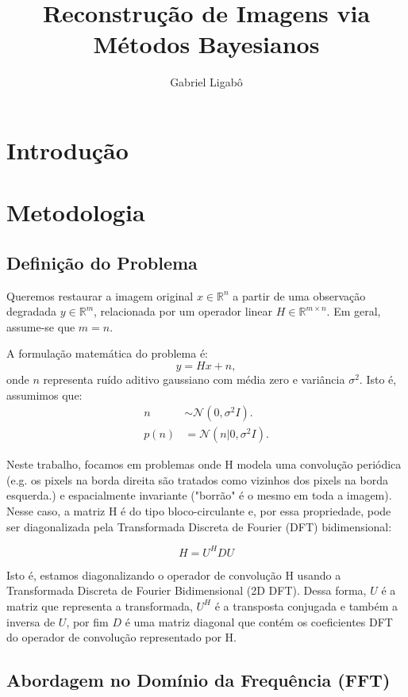 \documentclass[12pt]{article}
\title{Reconstrução de Imagens via Métodos Bayesianos}
\author{Gabriel Ligabô}
\begin{document}
\maketitle

\section{Introdução}

\section{Metodologia}

\subsection{Definição do Problema}

Queremos restaurar a imagem original $x \in \mathbb{R}^n$ a partir de uma observação degradada $y \in \mathbb{R}^m$, relacionada por um operador linear $H \in \mathbb{R}^{m \times n}$. Em geral, assume-se que $m = n$.

A formulação matemática do problema é:
\[
y = Hx + n,
\]
onde $n$ representa ruído aditivo gaussiano com média zero e variância $\sigma^2$. Isto é, assumimos que:
\begin{align*}
n &\sim \mathcal{N}(0, \sigma^2 I). \\
p(n) &= \mathcal{N}(n|0, \sigma^2 I).
\end{align*}

Neste trabalho, focamos em problemas onde H modela uma convolução periódica (e.g. os pixels na borda direita são tratados como vizinhos dos pixels na borda esquerda.) e espacialmente invariante ("borrão" é o mesmo em toda a imagem). Nesse caso, a matriz H é do tipo bloco-circulante e, por essa propriedade, pode ser diagonalizada pela Transformada Discreta de Fourier (DFT) bidimensional:

\[
H = U^HDU
\]

Isto é, estamos diagonalizando o operador de convolução H usando a Transformada Discreta de Fourier Bidimensional (2D DFT).
Dessa forma, $U$ é a matriz que representa a transformada, $U^H$ é a transposta conjugada e também a inversa de $U$, por fim $D$ é uma matriz diagonal que contém os coeficientes DFT do operador de convolução representado por H.


\subsection{Abordagem no Domínio da Frequência (FFT)}
\end{document}
